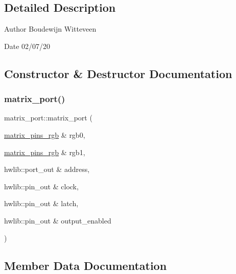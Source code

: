 \subsection{Detailed Description}
\begin{DoxyAuthor}{Author}
Boudewijn Witteveen 
\end{DoxyAuthor}
\begin{DoxyDate}{Date}
02/07/20 
\end{DoxyDate}


\subsection{Constructor \& Destructor Documentation}
\mbox{\label{classmatrix__port_a2d434ce8c9de69cab5408cae50e9d84a}} 
\subsubsection{\texorpdfstring{matrix\+\_\+port()}{matrix\_port()}}
{\footnotesize\ttfamily matrix\+\_\+port\+::matrix\+\_\+port (\begin{DoxyParamCaption}\item[{\hyperlink{classmatrix__pins__rgb}{matrix\+\_\+pins\+\_\+rgb} \&}]{rgb0,  }\item[{\hyperlink{classmatrix__pins__rgb}{matrix\+\_\+pins\+\_\+rgb} \&}]{rgb1,  }\item[{hwlib\+::port\+\_\+out \&}]{address,  }\item[{hwlib\+::pin\+\_\+out \&}]{clock,  }\item[{hwlib\+::pin\+\_\+out \&}]{latch,  }\item[{hwlib\+::pin\+\_\+out \&}]{output\+\_\+enabled }\end{DoxyParamCaption})\hspace{0.3cm}{\ttfamily [inline]}}



\subsection{Member Data Documentation}
\mbox{\label{classmatrix__port_a9c216b02627d4b595dfb5a4f64547df2}} 

